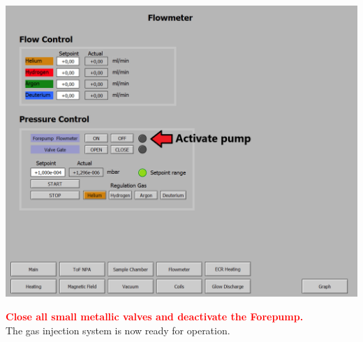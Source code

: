 \documentclass[fleqn,a4paper,20pt]{article}
\begin{document}
\begin{minipage}{.68\textwidth}
	\centering
	\includegraphics[width=0.95\linewidth]{Gas2}
	\label{Gas2}
 
\end{minipage}	
\vspace{0.2cm}
	
\textcolor{red}{\textbf{Close all small metallic valves and deactivate the Forepump.}}\\

The gas injection system is now ready for operation.

\newpage
\end{document}
